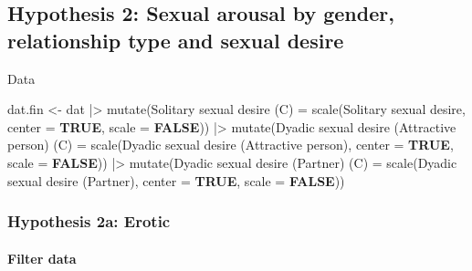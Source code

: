 \documentclass[
  bookmarksnumbered]{article}
\newenvironment{Shaded}{\begin{snugshade}}{\end{snugshade}}
\newcommand{\AttributeTok}[1]{\textcolor[rgb]{0.80,0.80,0.80}{#1}}
\newcommand{\ConstantTok}[1]{\textcolor[rgb]{0.86,0.64,0.64}{\textbf{#1}}}
\newcommand{\FunctionTok}[1]{\textcolor[rgb]{0.94,0.94,0.56}{#1}}
\newcommand{\NormalTok}[1]{\textcolor[rgb]{0.80,0.80,0.80}{#1}}
\newcommand{\OtherTok}[1]{\textcolor[rgb]{0.94,0.94,0.56}{#1}}
\newcommand{\SpecialCharTok}[1]{\textcolor[rgb]{0.86,0.64,0.64}{#1}}
\newcommand{\StringTok}[1]{\textcolor[rgb]{0.80,0.58,0.58}{#1}}
\begin{document}
\hypertarget{hypothesis2}{%
\subsection{Hypothesis 2: Sexual arousal by gender, relationship type and sexual desire}\label{hypothesis2}}

Data

\begin{Shaded}
\begin{Highlighting}[]
\NormalTok{dat.fin }\OtherTok{\textless{}{-}}\NormalTok{ dat }\SpecialCharTok{|\textgreater{}}
  \FunctionTok{mutate}\NormalTok{(}\StringTok{\textasciigrave{}}\AttributeTok{Solitary sexual desire (C)}\StringTok{\textasciigrave{}} \OtherTok{=} 
           \FunctionTok{scale}\NormalTok{(}\StringTok{\textasciigrave{}}\AttributeTok{Solitary sexual desire}\StringTok{\textasciigrave{}}\NormalTok{,}
                 \AttributeTok{center =} \ConstantTok{TRUE}\NormalTok{, }\AttributeTok{scale =} \ConstantTok{FALSE}\NormalTok{)) }\SpecialCharTok{|\textgreater{}}
  \FunctionTok{mutate}\NormalTok{(}\StringTok{\textasciigrave{}}\AttributeTok{Dyadic sexual desire (Attractive person) (C)}\StringTok{\textasciigrave{}} \OtherTok{=} 
           \FunctionTok{scale}\NormalTok{(}\StringTok{\textasciigrave{}}\AttributeTok{Dyadic sexual desire (Attractive person)}\StringTok{\textasciigrave{}}\NormalTok{, }
                 \AttributeTok{center =} \ConstantTok{TRUE}\NormalTok{, }\AttributeTok{scale =} \ConstantTok{FALSE}\NormalTok{)) }\SpecialCharTok{|\textgreater{}}
  \FunctionTok{mutate}\NormalTok{(}\StringTok{\textasciigrave{}}\AttributeTok{Dyadic sexual desire (Partner) (C)}\StringTok{\textasciigrave{}} \OtherTok{=} 
           \FunctionTok{scale}\NormalTok{(}\StringTok{\textasciigrave{}}\AttributeTok{Dyadic sexual desire (Partner)}\StringTok{\textasciigrave{}}\NormalTok{,}
                 \AttributeTok{center =} \ConstantTok{TRUE}\NormalTok{, }\AttributeTok{scale =} \ConstantTok{FALSE}\NormalTok{))}
\end{Highlighting}
\end{Shaded}

\hypertarget{hypothesis2a}{%
\subsubsection{Hypothesis 2a: Erotic}\label{hypothesis2a}}

\hypertarget{filter-data-1}{%
\paragraph{Filter data}\label{filter-data-1}}
\end{document}
